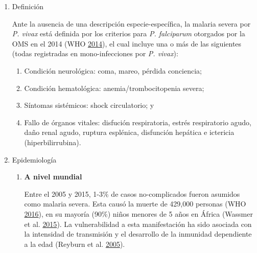 \documentclass[
  a4paper]{article}
\providecommand{\tightlist}{%
  \setlength{\itemsep}{0pt}\setlength{\parskip}{0pt}}
\begin{document}
\begin{enumerate}
\def\labelenumi{\alph{enumi}.}
\item
  Definición

  Ante la ausencia de una descripción especie-específica, la malaria
  severa por \emph{P. vivax} está definida por los criterios para
  \emph{P. falciparum} otorgados por la OMS en el 2014 (WHO
  \protect\hyperlink{ref-WHO2014severe}{2014}), el cual incluye una o
  más de las siguientes (todas registradas en mono-infecciones por
  \emph{P. vivax}):

  \begin{enumerate}
  \def\labelenumii{\arabic{enumii}.}
  \tightlist
  \item
    Condición neurológica: coma, mareo, pérdida conciencia;
  \item
    Condición hematológica: anemia/trombocitopenia severa;
  \item
    Síntomas sistémicos: shock circulatorio; y
  \item
    Fallo de órganos vitales: disfución respiratoria, estrés
    respiratorio agudo, daño renal agudo, ruptura esplénica, disfunción
    hepática e ictericia (hiperbilirrubina).
  \end{enumerate}
\item
  Epidemiología

  \begin{enumerate}
  \def\labelenumii{\roman{enumii}.}
  \item
    \textbf{A nivel mundial}

    Entre el 2005 y 2015, 1-3\% de casos no-complicados fueron asumidos
    como malaria severa. Esta causó la muerte de 429,000 personas (WHO
    \protect\hyperlink{ref-WHO2016world}{2016}), en su mayoría (90\%)
    niños menores de 5 años en África (Wassmer et al.
    \protect\hyperlink{ref-wassmer2015}{2015}). La vulnerabilidad a esta
    manifestación ha sido asociada con la intensidad de transmisión y el
    desarrollo de la inmunidad dependiente a la edad (Reyburn et al.
    \protect\hyperlink{ref-reyburn2015}{2005}).


\end{enumerate}
\end{enumerate}
\end{document}
